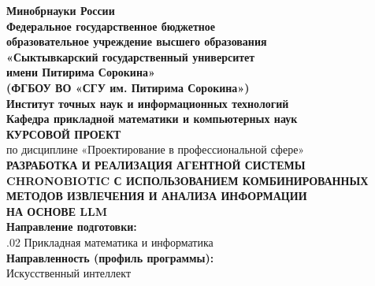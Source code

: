 \begin{titlepage}
	
	
	\thispagestyle{empty}
	
	\begin{center}
		{\bfseries\fontsize{12pt}{14pt}\selectfont Минобрнауки России}\\
		
		{\bfseries\fontsize{12pt}{14pt}\selectfont Федеральное государственное бюджетное\\
			образовательное учреждение высшего образования\\
			«Сыктывкарский государственный университет\\
			имени Питирима Сорокина»\\
			(ФГБОУ ВО «СГУ им. Питирима Сорокина»)}\\
		
		{\bfseries\fontsize{12pt}{14pt}\selectfont Институт точных наук и информационных технологий}\\
		
		{\bfseries\fontsize{12pt}{14pt}\selectfont Кафедра прикладной математики и компьютерных наук}\\[2cm]
		
		{\fontsize{16pt}{20pt}\selectfont\bfseries КУРСОВОЙ ПРОЕКТ}\\
		
		{\fontsize{12pt}{14pt}\selectfont
			по дисциплине «Проектирование в профессиональной сфере»}\\
		
		{\bfseries\fontsize{14pt}{18pt}\selectfont
			РАЗРАБОТКА И РЕАЛИЗАЦИЯ АГЕНТНОЙ СИСТЕМЫ\\
			CHRONOBIOTIC С ИСПОЛЬЗОВАНИЕМ КОМБИНИРОВАННЫХ\\
			МЕТОДОВ ИЗВЛЕЧЕНИЯ И АНАЛИЗА ИНФОРМАЦИИ\\
			НА ОСНОВЕ LLM}\\[2cm]
		
		{\bfseries\fontsize{12pt}{14pt}\selectfont Направление подготовки:}\\
		{\fontsize{12pt}{14pt}.02 Прикладная математика и информатика}\\[0.5cm]
		
		{\bfseries\fontsize{12pt}{14pt}\selectfont
			Направленность (профиль программы):}\\
		{\fontsize{12pt}{14pt}\selectfont Искусственный интеллект}
	\end{center}
	

\end{titlepage}
